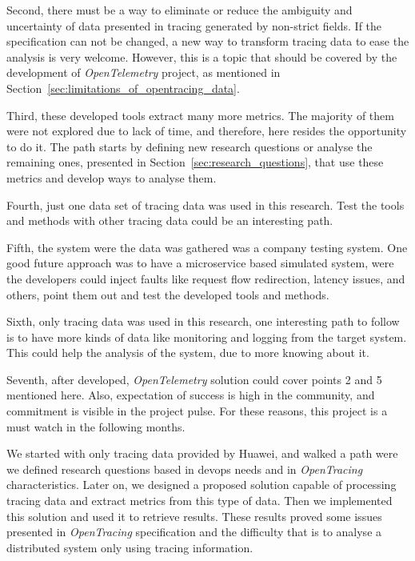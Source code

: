 Second, there must be a way to eliminate or reduce the ambiguity and uncertainty of data presented in tracing generated by non-strict fields. If the specification can not be changed, a new way to transform tracing data to ease the analysis is very welcome. However, this is a topic that should be covered by the development of \emph{OpenTelemetry} project, as mentioned in Section~\ref{sec:limitations_of_opentracing_data}.

Third, these developed tools extract many more metrics. The majority of them were not explored due to lack of time, and therefore, here resides the opportunity to do it. The path starts by defining new research questions or analyse the remaining ones, presented in Section~\ref{sec:research_questions}, that use these metrics and develop ways to analyse them.

Fourth, just one data set of tracing data was used in this research. Test the tools and methods with other tracing data could be an interesting path.

Fifth, the system were the data was gathered was a company testing system. One good future approach was to have a microservice based simulated system, were the developers could inject faults like request flow redirection, latency issues, and others, point them out and test the developed tools and methods.

Sixth, only tracing data was used in this research, one interesting path to follow is to have more kinds of data like monitoring and logging from the target system. This could help the analysis of the system, due to more knowing about it.

Seventh, after developed, \emph{OpenTelemetry} solution could cover points 2 and 5 mentioned here. Also, expectation of success is high in the community, and commitment is visible in the project pulse. For these reasons, this project is a must watch in the following months.


We started with only tracing data provided by Huawei, and walked a path were we defined research questions based in \gls{devops} needs and in \emph{OpenTracing} characteristics. Later on, we designed a proposed solution capable of processing tracing data and extract metrics from this type of data. Then we implemented this solution and used it to retrieve results. These results proved some issues presented in \emph{OpenTracing} specification and the difficulty that is to analyse a distributed system only using tracing information.

